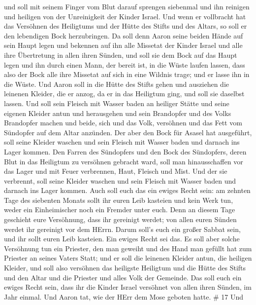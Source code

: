  und soll mit seinem Finger vom Blut darauf sprengen
siebenmal und ihn reinigen und heiligen von der Unreinigkeit der Kinder
Israel.  Und wenn er vollbracht hat das Versöhnen des
Heiligtums und der Hütte des Stifts und des Altars, so soll er den
lebendigen Bock herzubringen.  Da soll denn Aaron seine
beiden Hände auf sein Haupt legen und bekennen auf ihn alle Missetat der
Kinder Israel und alle ihre Übertretung in allen ihren Sünden, und soll
sie dem Bock auf das Haupt legen und ihn durch einen Mann, der bereit
ist, in die Wüste laufen lassen,  dass also der Bock alle
ihre Missetat auf sich in eine Wildnis trage; und er lasse ihn in die
Wüste.  Und Aaron soll in die Hütte des Stifts gehen und
ausziehen die leinenen Kleider, die er anzog, da er in das Heiligtum
ging, und soll sie daselbst lassen.  Und soll sein Fleisch
mit Wasser baden an heiliger Stätte und seine eigenen Kleider antun und
herausgehen und sein Brandopfer und des Volks Brandopfer machen und
beide, sich und das Volk, versöhnen  und das Fett vom
Sündopfer auf dem Altar anzünden.  Der aber den Bock für
Asasel hat ausgeführt, soll seine Kleider waschen und sein Fleisch mit
Wasser baden und darnach ins Lager kommen.  Den Farren des
Sündopfers und den Bock des Sündopfers, deren Blut in das Heiligtum zu
versöhnen gebracht ward, soll man hinausschaffen vor das Lager und mit
Feuer verbrennen, Haut, Fleisch und Mist.  Und der sie
verbrennt, soll seine Kleider waschen und sein Fleisch mit Wasser baden
und darnach ins Lager kommen.  Auch soll euch das ein
ewiges Recht sein: am zehnten Tage des siebenten Monats sollt ihr euren
Leib kasteien und kein Werk tun, weder ein Einheimischer noch ein
Fremder unter euch.  Denn an diesem Tage geschieht eure
Versöhnung, dass ihr gereinigt werdet; von allen euren Sünden werdet ihr
gereinigt vor dem HErrn.  Darum soll's euch ein großer
Sabbat sein, und ihr sollt euren Leib kasteien. Ein ewiges Recht sei
das.  Es soll aber solche Versöhnung tun ein Priester, den
man geweiht und des Hand man gefüllt hat zum Priester an seines Vaters
Statt; und er soll die leinenen Kleider antun, die heiligen Kleider,
 und soll also versöhnen das heiligste Heiligtum und die
Hütte des Stifts und den Altar und die Priester und alles Volk der
Gemeinde.  Das soll euch ein ewiges Recht sein, dass ihr
die Kinder Israel versöhnet von allen ihren Sünden, im Jahr einmal. Und
Aaron tat, wie der HErr dem Mose geboten hatte. \# 17  Und
